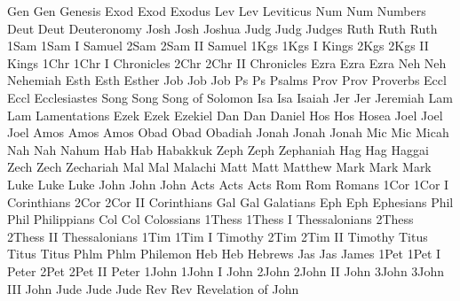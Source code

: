 \BookTitle Gen Gen {Genesis}
\BookTitle Exod Exod {Exodus}
\BookTitle Lev Lev {Leviticus}
\BookTitle Num Num {Numbers}
\BookTitle Deut Deut {Deuteronomy}
\BookTitle Josh Josh {Joshua}
\BookTitle Judg Judg {Judges}
\BookTitle Ruth Ruth {Ruth}
\BookTitle 1Sam 1Sam {I Samuel}
\BookTitle 2Sam 2Sam {II Samuel}
\BookTitle 1Kgs 1Kgs {I Kings}
\BookTitle 2Kgs 2Kgs {II Kings}
\BookTitle 1Chr 1Chr {I Chronicles}
\BookTitle 2Chr 2Chr {II Chronicles}
\BookTitle Ezra Ezra {Ezra}
\BookTitle Neh Neh {Nehemiah}
\BookTitle Esth Esth {Esther}
\BookTitle Job Job {Job}
\BookTitle Ps Ps {Psalms}
\BookTitle Prov Prov {Proverbs}
\BookTitle Eccl Eccl {Ecclesiastes}
\BookTitle Song Song {Song of Solomon}
\BookTitle Isa Isa {Isaiah}
\BookTitle Jer Jer {Jeremiah}
\BookTitle Lam Lam {Lamentations}
\BookTitle Ezek Ezek {Ezekiel}
\BookTitle Dan Dan {Daniel}
\BookTitle Hos Hos {Hosea}
\BookTitle Joel Joel {Joel}
\BookTitle Amos Amos {Amos}
\BookTitle Obad Obad {Obadiah}
\BookTitle Jonah Jonah {Jonah}
\BookTitle Mic Mic {Micah}
\BookTitle Nah Nah {Nahum}
\BookTitle Hab Hab {Habakkuk}
\BookTitle Zeph Zeph {Zephaniah}
\BookTitle Hag Hag {Haggai}
\BookTitle Zech Zech {Zechariah}
\BookTitle Mal Mal {Malachi}
\BookTitle Matt Matt {Matthew}
\BookTitle Mark Mark {Mark}
\BookTitle Luke Luke {Luke}
\BookTitle John John {John}
\BookTitle Acts Acts {Acts}
\BookTitle Rom Rom {Romans}
\BookTitle 1Cor 1Cor {I Corinthians}
\BookTitle 2Cor 2Cor {II Corinthians}
\BookTitle Gal Gal {Galatians}
\BookTitle Eph Eph {Ephesians}
\BookTitle Phil Phil {Philippians}
\BookTitle Col Col {Colossians}
\BookTitle 1Thess 1Thess {I Thessalonians}
\BookTitle 2Thess 2Thess {II Thessalonians}
\BookTitle 1Tim 1Tim {I Timothy}
\BookTitle 2Tim 2Tim {II Timothy}
\BookTitle Titus Titus {Titus}
\BookTitle Phlm Phlm {Philemon}
\BookTitle Heb Heb {Hebrews}
\BookTitle Jas Jas {James}
\BookTitle 1Pet 1Pet {I Peter}
\BookTitle 2Pet 2Pet {II Peter}
\BookTitle 1John 1John {I John}
\BookTitle 2John 2John {II John}
\BookTitle 3John 3John {III John}
\BookTitle Jude Jude {Jude}
\BookTitle Rev Rev {Revelation of John}
